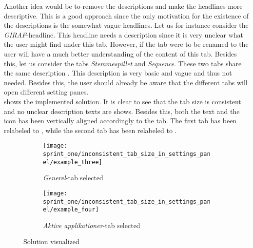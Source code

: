 Another idea would be to remove the descriptions and make the headlines more descriptive. This is a good approach since the only motivation for the existence of the descriptions is the somewhat vague headlines. Let us for instance consider the \emph{GIRAF}-headline. This headline needs a description since it is very unclear what the user might find under this tab. However, if the tab were to be renamed to  the user will have a much better understanding of the content of this tab. Besides this, let us consider the tabs \emph{Stemmespillet} and \emph{Sequence}. These two tabs share the same description . This description is very basic and vague and thus not needed. Besides this, the user should already be aware that the different tabs will open different setting panes. \\

 shows the implemented solution. It is clear to see that the tab size is consistent and no unclear description texts are shows. Besides this, both the text and the icon has been vertically aligned accordingly to the tab. The first tab has been relabeled to , while the second tab has been relabeled to .

\begin{figure}[!htbp]
    \centering

    \begin{subfigure}[t]{0.3\textwidth}
        \texttt{[image: sprint\_one/inconsistent\_tab\_size\_in\_settings\_panel/example\_three]}
        \caption{\emph{Generel}-tab selected}
        \label{fig:inconsistent_tab_size_in_settings_panel_example_one_solution}
    \end{subfigure}
    \hspace{5em} 
    \begin{subfigure}[t]{0.3\textwidth}
        \texttt{[image: sprint\_one/inconsistent\_tab\_size\_in\_settings\_panel/example\_four]}
        \caption{\emph{Aktive applikationer}-tab selected}
        \label{fig:inconsistent_tab_size_in_settings_panel_example_two_solution}
    \end{subfigure}
    
    \caption{Solution visualized}
    \label{fig:inconsistent_tab_size_in_settings_panel_example_solution}
\end{figure}